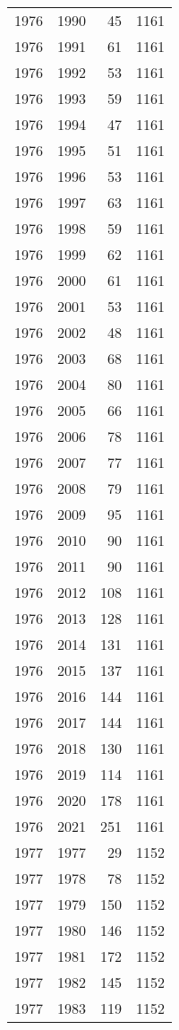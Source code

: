 \documentclass[
  11pt,
  letterpaper,
  DIV=11,
  numbers=noendperiod,
  twoside]{scrartcl}
\begin{document}
\begin{longtable}[]{@{}rrrr@{}}
1976 & 1990 & 45 & 1161 \\
1976 & 1991 & 61 & 1161 \\
1976 & 1992 & 53 & 1161 \\
1976 & 1993 & 59 & 1161 \\
1976 & 1994 & 47 & 1161 \\
1976 & 1995 & 51 & 1161 \\
1976 & 1996 & 53 & 1161 \\
1976 & 1997 & 63 & 1161 \\
1976 & 1998 & 59 & 1161 \\
1976 & 1999 & 62 & 1161 \\
1976 & 2000 & 61 & 1161 \\
1976 & 2001 & 53 & 1161 \\
1976 & 2002 & 48 & 1161 \\
1976 & 2003 & 68 & 1161 \\
1976 & 2004 & 80 & 1161 \\
1976 & 2005 & 66 & 1161 \\
1976 & 2006 & 78 & 1161 \\
1976 & 2007 & 77 & 1161 \\
1976 & 2008 & 79 & 1161 \\
1976 & 2009 & 95 & 1161 \\
1976 & 2010 & 90 & 1161 \\
1976 & 2011 & 90 & 1161 \\
1976 & 2012 & 108 & 1161 \\
1976 & 2013 & 128 & 1161 \\
1976 & 2014 & 131 & 1161 \\
1976 & 2015 & 137 & 1161 \\
1976 & 2016 & 144 & 1161 \\
1976 & 2017 & 144 & 1161 \\
1976 & 2018 & 130 & 1161 \\
1976 & 2019 & 114 & 1161 \\
1976 & 2020 & 178 & 1161 \\
1976 & 2021 & 251 & 1161 \\
1977 & 1977 & 29 & 1152 \\
1977 & 1978 & 78 & 1152 \\
1977 & 1979 & 150 & 1152 \\
1977 & 1980 & 146 & 1152 \\
1977 & 1981 & 172 & 1152 \\
1977 & 1982 & 145 & 1152 \\
1977 & 1983 & 119 & 1152 \\

\end{longtable}
\end{document}
